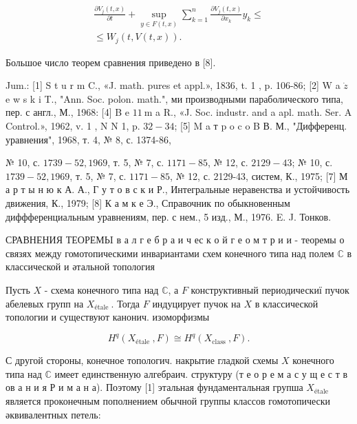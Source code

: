 \documentclass[10pt]{article}
\begin{document}
\[

\begin{gathered}

\frac{\partial V_{j}(t, x)}{\partial t}+\sup _{y \in F(t, x)} \sum_{k=1}^{n} \frac{\partial V_{j}(t, x)}{\partial x_{k}} y_{k} \leqslant \\

\leqslant W_{j}(t, V(t, x)) .

\end{gathered}

\]



Большое число теорем сравнения приведено в [8].



Jum.: [1] S t u r m C., «J. math. pures et appl.», 1836, t. 1 , p. 106-86; [2] W a $\dot{z}$ e w s k i T., "Ann. Soc. polon. math.", ми производными параболического типа, пер. с англ., М., 1968: [4] B e $11 \mathrm{~m}$ a $\mathrm{R}$., «J. Soc. industr. and a apl. math. Ser. A Control.», 1962, v. 1 , N N 1, p. $32-34$; [5] M a т p o c o B В. М., "Дифференц. уравнения", 1968, т. 4, № 8, с. 1374-86,

№ 10, с. $1739-52,1969$, т. 5, № 7, с. $1171-85$, № 12, с. $2129-43$; № 10, с. $1739-52,1969$, т. 5, № 7, с. $1171-85$, № 12, с. 2129-43, систем, К., 1975; [7] М а р т ы н ю к А. А., Г у т о в с к и Р., Интегральные неравенства и устойчивость движения, К., 1979; [8] К а м к е Э., Справочник по обыкновенным диффференциальным уравнениям, пер. с нем., 5 изд., М., 1976. E. J. Тонков.



СРАВНЕНИЯ ТЕОРЕМЬI в а л г е б р а и ч ес к о й г е о м т р и и - теоремы о связях между гомотопическими инвариантами схем конечного типа над полем $\mathbb{C}$ в классической и әтальной топология



Пусть $X$ - схема конечного типа над $\mathbb{C}$, а $F$ конструктивный периодическиї пучок абелевых групп на $X_{\text {étale }}$. Тогда $F$ индуцирует пучок на $X$ в классической топологии и существуют канонич. изоморфизмы



\[

H^{q}\left(X_{\text {étale }}, F\right) \cong H^{q}\left(X_{\text {class }}, F\right) .

\]



С другой стороны, конечное топологич. накрытие гладкой схемы $X$ конечного типа над $\mathbb{C}$ имеет единственную алгебраич. структуру (т е о р е м а с у щ е с т в ов а н и я Р и м а н а). Поэтому [1] этальная фундаментальная групша $X_{\text {étale }}$ является проконечным пополнением обычной группы классов гомотопически әквивалентных петель:
\end{document}
